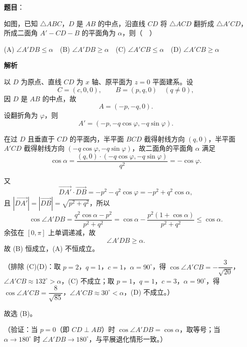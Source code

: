 \begin{answer}

\textbf{题目}：

如图，已知 \(\triangle ABC\)，\(D\) 是 \(AB\) 的中点，沿直线 \(CD\) 将 \(\triangle ACD\) 翻折成 \(\triangle A'CD\)，所成二面角 \(A'-CD-B\) 的平面角为 \(\alpha\)，则（　）
\nopagebreak[4]
\begin{center}\end{center}
\nopagebreak[4]
(A) \(\angle A'DB\leqslant\alpha\)　(B) \(\angle A'DB\geqslant\alpha\)　(C) \(\angle A'CB\leqslant\alpha\)　(D) \(\angle A'CB\geqslant\alpha\)

\textbf{解析}

以 \(D\) 为原点、直线 \(CD\) 为 \(x\) 轴、原平面为 \(z=0\) 平面建系。设
\nopagebreak[4]
\[
C=(c,0,0),\qquad B=(p,q,0)\quad(q\neq0),
\]
因 \(D\) 是 \(AB\) 的中点，故
\nopagebreak[4]
\[
A=(-p,-q,0).
\]
设翻折角为 \(\varphi\)，则
\nopagebreak[4]
\[
A'=(-p,-q\cos\varphi,-q\sin\varphi).
\]

在过 \(D\) 且垂直于 \(CD\) 的平面内，半平面 \(BCD\) 截得射线方向 \((q,0)\)，半平面 \(A'CD\) 截得射线方向 \((-q\cos\varphi,-q\sin\varphi)\)，故二面角的平面角 \(\alpha\) 满足
\nopagebreak[4]
\[
\cos\alpha=\frac{(q,0)\cdot(-q\cos\varphi,-q\sin\varphi)}{q^2}
=-\cos\varphi.
\]

又
\nopagebreak[4]
\[
\overrightarrow{DA'}\cdot\overrightarrow{DB}
=-p^2-q^2\cos\varphi=-p^2+q^2\cos\alpha,
\]
且 \(|\overrightarrow{DA'}|=|\overrightarrow{DB}|=\sqrt{p^2+q^2}\)，所以
\nopagebreak[4]
\[
\cos\angle A'DB=\frac{q^2\cos\alpha-p^2}{p^2+q^2}
=\cos\alpha-\frac{p^2(1+\cos\alpha)}{p^2+q^2}\leqslant\cos\alpha.
\]
余弦在 \([0,\pi]\) 上单调递减，故
\nopagebreak[4]
\[
\angle A'DB\geqslant\alpha.
\]
故 (B) 恒成立，(A) 不恒成立。

（排除 (C)(D)：取 \(p=2\)，\(q=1\)，\(c=1\)，\(\alpha=90^\circ\)，得 \(\cos\angle A'CB=-\dfrac{3}{\sqrt{20}}\)，\(\angle A'CB\approx132^\circ>\alpha\)，(C) 不成立；取 \(p=1\)，\(q=1\)，\(c=3\)，\(\alpha=90^\circ\)，得 \(\cos\angle A'CB=\dfrac{8}{\sqrt{85}}\)，\(\angle A'CB\approx30^\circ<\alpha\)，(D) 不成立。）

故选 (B)。

（验证：当 \(p=0\)（即 \(CD\perp AB\)）时 \(\cos\angle A'DB=\cos\alpha\)，取等号；当 \(\alpha\to180^\circ\) 时 \(\angle A'DB\to180^\circ\)，与平展退化情形一致。）


\end{answer}
